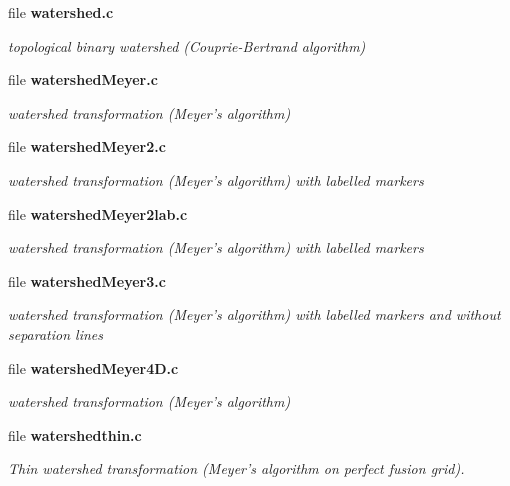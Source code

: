 \begin{CompactItemize}
\item 
file \bf{watershed.c}
\begin{CompactList}\small\item\em topological binary watershed (Couprie-Bertrand algorithm) \item\end{CompactList}

\item 
file \bf{watershed\-Meyer.c}
\begin{CompactList}\small\item\em watershed transformation (Meyer's algorithm) \item\end{CompactList}

\item 
file \bf{watershed\-Meyer2.c}
\begin{CompactList}\small\item\em watershed transformation (Meyer's algorithm) with labelled markers \item\end{CompactList}

\item 
file \bf{watershed\-Meyer2lab.c}
\begin{CompactList}\small\item\em watershed transformation (Meyer's algorithm) with labelled markers \item\end{CompactList}

\item 
file \bf{watershed\-Meyer3.c}
\begin{CompactList}\small\item\em watershed transformation (Meyer's algorithm) with labelled markers and without separation lines \item\end{CompactList}

\item 
file \bf{watershed\-Meyer4D.c}
\begin{CompactList}\small\item\em watershed transformation (Meyer's algorithm) \item\end{CompactList}

\item 
file \bf{watershedthin.c}
\begin{CompactList}\small\item\em Thin watershed transformation (Meyer's algorithm on perfect fusion grid). \item\end{CompactList}


\end{CompactItemize}
